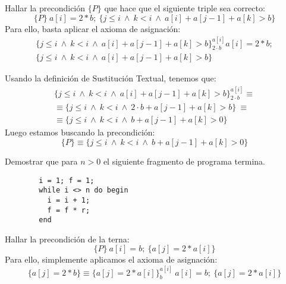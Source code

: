 \begin{ejercicio}
    Hallar la precondición $\{P\}$ que hace que el siguiente triple sea correcto:
    \begin{equation*}
        \{P\}\ a[i]=2\ast b;\ \{j\leq i ~\land~ k < i ~\land~ a[i] + a[j-1]+a[k]>b\}
    \end{equation*}
    Para ello, basta aplicar el axioma de asignación:
    \begin{gather*}
        \{j\leq i~\land~ k < i ~\land~ a[i] + a[j-1]+a[k]>b\}_{2\cdot b}^{a[i]} a[i]=2\ast b;\\ \{j\leq i ~\land~ k < i ~\land~ a[i] + a[j-1]+a[k]>b\}
    \end{gather*}

    Usando la definición de Sustitución Textual, tenemos que:
    \begin{gather*}
        \{j\leq i~\land~ k < i ~\land~ a[i] + a[j-1]+a[k]>b\}_{2\cdot b}^{a[i]} \equiv \\ \equiv \{j\leq i ~\land~ k < i ~\land~ 2\cdot b + a[j-1]+a[k]>b\}
        \ \equiv\\ \equiv \{j\leq i ~\land~ k < i ~\land~ b + a[j-1]+a[k]>0\}
    \end{gather*}
    Luego estamos buscando la precondición:
    \begin{equation*}
        \{P\} \equiv \{j\leq i ~\land~ k < i ~\land ~b + a[j-1]+a[k]>0\}
    \end{equation*}
\end{ejercicio}

\begin{ejercicio}
    Demostrar que para $n>0$ el siguiente fragmento de programa termina.
    \begin{verbatim}
        i = 1; f = 1;
        while i <> n do begin
          i = i + 1;
          f = f * r;
        end
    \end{verbatim}
\end{ejercicio}

\begin{ejercicio}
    Hallar la precondición de la terna:
    \begin{equation*}
        \{P\}\ a[i]=b;\ \{a[j] = 2\ast a[i]\}
    \end{equation*}
    Para ello, simplemente aplicamos el axioma de asignación:
    \begin{equation*}
        \{a[j]=2\ast b\} \equiv \{a[j]=2\ast a[i]\}_{b}^{a[i]}\ a[i]=b;\ \{a[j] = 2\ast a[i]\}
    \end{equation*}
\end{ejercicio}

